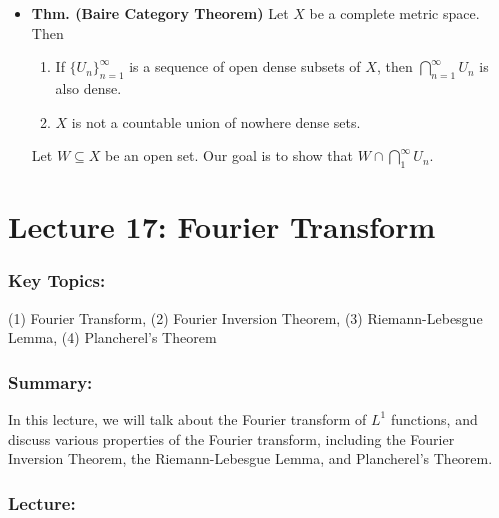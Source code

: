 \documentclass{article}
\begin{document}
\begin{itemize}
	\item \textbf{Thm. (Baire Category Theorem)} Let $X$ be a complete metric space. Then \vspace{-0.25cm}
		\begin{enumerate}[itemsep =-2pt,label = (\alph{*})]
			\item If $\{U_{n}\}_{n=1}^{\infty}$ is a sequence of open dense subsets of $X$, then $\bigcap_{n=1}^{\infty}U_{n}$ is also dense. 
			\item $X$ is not a countable union of nowhere dense sets. 
		\end{enumerate}
	\begin{solutions}
		Let $W \subseteq X$ be an open set. Our goal is to show that $W \cap \bigcap_{1}^{\infty}U_{n}$.
	\end{solutions}
\end{itemize}



\newpage 
\section{Lecture 17: Fourier Transform} 
\subsubsection{Key Topics:} (1) Fourier Transform, (2) Fourier Inversion Theorem, (3) Riemann-Lebesgue Lemma, (4) Plancherel's Theorem 

\subsubsection{Summary:} In this lecture, we will talk about the Fourier transform of $L^{1}$ functions, and discuss various properties of the Fourier transform, including the Fourier Inversion Theorem, the Riemann-Lebesgue Lemma, and Plancherel's Theorem. 

\subsubsection{Lecture:}
\end{document}

